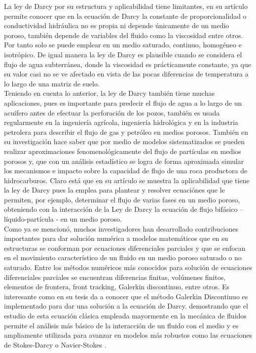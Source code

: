 La ley de Darcy por su estructura y aplicabilidad tiene limitantes, en su artículo \parencite{romana2014limites} permite conocer que en la ecuación de Darcy la constante de proporcionalidad o conductividad hidráulica no es propia ni depende únicamente de un medio poroso, también depende de variables del fluido como la viscosidad entre otros. Por tanto solo se puede emplear en un medio saturado, continuo, homogéneo e isotrópico. De igual manera la ley de Darcy es plausible cuando se considera el flujo de agua subterránea, donde la viscosidad es prácticamente constante, ya que su valor casi no se ve afectado en vista de las pocas diferencias de temperatura a lo largo de una matriz de suelo. \\

Teniendo en cuenta lo anterior, la ley de Darcy también tiene muchas aplicaciones, pues es importante para predecir el flujo de agua a lo largo de un acuífero antes de efectuar la perforación de los pozos, también es usada regularmente en la ingeniería agrícola, ingeniería hidrológica y en la industria petrolera para describir el flujo de gas y petróleo en medios porosos. También \parencite{ruizmodelo} en su investigación hace saber que por medio de  modelos sistematizados se pueden realizar  aproximaciones fenomenológicamente del flujo de partículas en medios porosos y, que con un análisis estadístico se logra de forma aproximada simular los mecanismos  e impacto sobre la capacidad de flujo de una roca productora de hidrocarburos. Claro está que en su artículo se muestra la aplicabilidad que tiene la ley de Darcy pues la emplea para plantear y resolver ecuaciónes que le permiten, por ejemplo, determinar el flujo de varias fases en un medio poroso, obteniendo con la interacción de la Ley de Darcy la ecuación de flujo bifásico – líquido-partícula - en un medio poroso.\\

Como ya se mencionó, muchos investigadores han desarrollado contribuciones importantes para dar solución numérica a modelos matemáticos que en su estructuras se conforman por ecuaciones diferenciales parciales y que se enfocan en el movimiento característico de un fluido en un medio poroso saturado o no saturado. Entre los métodos numéricos más conocidos para solución de ecuaciones diferenciales parciales se encuentran diferencias finitas, volúmenes finitos, elementos de frontera, front tracking, Galerkin discontinuo, entre otros. Es interesante como \parencite{bastidasmetodo} en su tesis  da a conocer que el  método Galerkin Discontinuo es implementado para dar una solución a  la ecuación de Darcy. demostrando que el  estudio de esta ecuación clásica empleada mayormente en la mecánica de fluidos permite el análisis más básico de la interacción de un fluido con el medio y es ampliamente utilizada para avanzar en modelos más robustos como las ecuaciones de Stokes-Darcy o Navier-Stokes . \\


